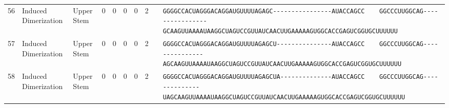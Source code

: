 \begin{tabular}{rllrrrrrcl}
 56 & Induced Dimerization & Upper Stem & 0 & 0 & 0 & 0 & 2 &  &
 \color{ucsfdarkgrey}\verb|GGGGCCACUAGGGACAGGAU|\color{ucsforange}\verb|GUUUUA|\color{ucsfblue}\verb|GAGC----------------|\color{ucsfpurple}\verb|AUACCAGCC    GGCCCUUGGCAG|\color{ucsfblue}\verb|----------------GCAAGU|\color{ucsforange}\verb|UAAAAUAA|\color{ucsfnavy}\verb|GGCUAGUCC|\color{ucsforange}\verb|GUUAUCA|\color{ucsfteal}\verb|ACUUGAAAAAGU|\color{ucsforange}\verb|GGCACCGAGUCGGUGCUUUUUU| \\

 57 & Induced Dimerization & Upper Stem & 0 & 0 & 0 & 0 & 2 &  &
 \color{ucsfdarkgrey}\verb|GGGGCCACUAGGGACAGGAU|\color{ucsforange}\verb|GUUUUA|\color{ucsfblue}\verb|GAGCU---------------|\color{ucsfpurple}\verb|AUACCAGCC    GGCCCUUGGCAG|\color{ucsfblue}\verb|---------------AGCAAGU|\color{ucsforange}\verb|UAAAAUAA|\color{ucsfnavy}\verb|GGCUAGUCC|\color{ucsforange}\verb|GUUAUCA|\color{ucsfteal}\verb|ACUUGAAAAAGU|\color{ucsforange}\verb|GGCACCGAGUCGGUGCUUUUUU| \\

 58 & Induced Dimerization & Upper Stem & 0 & 0 & 0 & 0 & 2 &  &
 \color{ucsfdarkgrey}\verb|GGGGCCACUAGGGACAGGAU|\color{ucsforange}\verb|GUUUUA|\color{ucsfblue}\verb|GAGCUA--------------|\color{ucsfpurple}\verb|AUACCAGCC    GGCCCUUGGCAG|\color{ucsfblue}\verb|--------------UAGCAAGU|\color{ucsforange}\verb|UAAAAUAA|\color{ucsfnavy}\verb|GGCUAGUCC|\color{ucsforange}\verb|GUUAUCA|\color{ucsfteal}\verb|ACUUGAAAAAGU|\color{ucsforange}\verb|GGCACCGAGUCGGUGCUUUUUU| \\

\bottomrule
\end{tabular}
